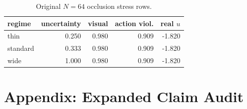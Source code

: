 \documentclass{article}
\begin{document}
\begin{table}[tbp]
  \centering
  \small
  \caption{Original \(N=64\) occlusion stress rows.}
  \label{tab:occlusion}
  \begin{tabular}{@{}lrrrr@{}}
    \toprule
    regime & uncertainty & visual & action viol. & real \(u\) \\
    \midrule
    thin & 0.250 & 0.980 & 0.909 & -1.820 \\
    standard & 0.333 & 0.980 & 0.909 & -1.820 \\
    wide & 1.000 & 0.980 & 0.909 & -1.820 \\
    \bottomrule
  \end{tabular}
\end{table}

\section{Appendix: Expanded Claim Audit}
\end{document}
